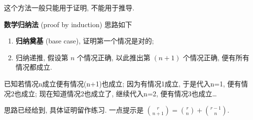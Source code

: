 \begin{tcolorbox}[size=fbox, breakable, enhanced jigsaw, title={数学归纳法}]

这个方法一般只能用于证明, 不能用于推导.

\begin{newquote}
\textbf{数学归纳法} (proof by induction) 思路如下

\begin{enumerate}
\def\labelenumi{\arabic{enumi}.}

\item
  \textbf{归纳奠基} (base case), 证明第一个情况是对的;
\item
  归纳递推, 假设第 $n$ 个情况正确, 以此推出第 $(n+1)$ 个情况正确,
  便有所有情况都成立.
\end{enumerate}

已知若情况n成立便有情况(n+1)也成立; 因为有情况1成立, 于是代入n=1,
便有情况2也成立; 现在知道情况2也成立了, 继续代入n=2,
便有情况3也成立\ldots{}
\end{newquote}

思路已经给到, 具体证明留作练习. 一点提示是
$\binom{r}{n+1}=\binom{r}{n}+\binom{r-1}{n}$.

\end{tcolorbox}


